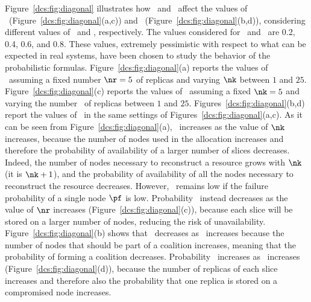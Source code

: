 Figure~\ref{dcs:fig:diagonal} illustrates how \nk\ and \nr\ affect the
values of \PF\ (Figure~\ref{dcs:fig:diagonal}(a,c)) and
\PC\ (Figure~\ref{dcs:fig:diagonal}(b,d)), considering different values of
\pf\ and \pc, respectively. The values considered for \pf\ and
\pc\ are 0.2, 0.4, 0.6, and 0.8. These values, extremely pessimistic
with respect to what can be expected in real systems, have been chosen
to study the behavior of the probabilistic formulas.
Figure~\ref{dcs:fig:diagonal}(a) reports the values of \PF\ assuming a
fixed number $\nr=5$ of replicas and varying $\nk$ between $1$ and
$25$.  Figure~\ref{dcs:fig:diagonal}(c) reports the values of
\PF\ assuming a fixed $\nk=5$ and varying the number \nr\ of replicas
between $1$ and $25$.  Figures~\ref{dcs:fig:diagonal}(b,d) report the
values of \PC\ in the same settings of
Figures~\ref{dcs:fig:diagonal}(a,c). As it can be seen from
Figure~\ref{dcs:fig:diagonal}(a), \PF\ increases as the value of $\nk$
increases, because the number of nodes used in the allocation
increases and therefore the probability of availability of a larger
number of slices decreases.  Indeed, the number of nodes necessary to
reconstruct a resource grows with $\nk$ (it is $\nk+1$), and the
probability of availability of all the nodes necessary to reconstruct
the resource decreases.  However, \PF\ remains low if the failure
probability of a single node $\pf$ is low. Probability \PF\ instead
decreases as the value of $\nr$ increases
(Figure~\ref{dcs:fig:diagonal}(c)), because each slice will be stored on a
larger number of nodes, reducing the risk of unavailability.
Figure~\ref{dcs:fig:diagonal}(b) shows that \PC\ decreases as
\nk\ increases because the number of nodes that should be part of a
coalition increases, meaning that the probability of forming a
coalition decreases. Probability \PC\ increases as \nr\ increases
(Figure~\ref{dcs:fig:diagonal}(d)), because the number of replicas of each
slice increases and therefore also the probability that one replica is
stored on a compromised node increases.


